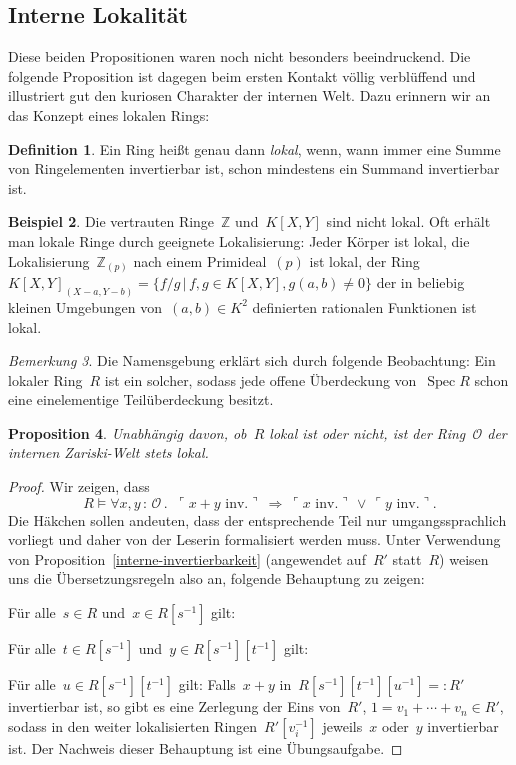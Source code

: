 \documentclass[a4paper,ngerman,12pt]{scrartcl}
\theoremstyle{definition}
\newtheorem{defn}{Definition}[section]
\newtheorem{bsp}[defn]{Beispiel}
\theoremstyle{plain}
\newtheorem{prop}[defn]{Proposition}
\theoremstyle{remark}
\newtheorem{bem}[defn]{Bemerkung}
\newcommand{\ZZ}{\mathbb{Z}}
\renewcommand{\O}{\mathcal{O}}
\DeclareMathOperator{\Spec}{Spec}
\renewcommand{\_}{\mathpunct{.}\,}
\newcommand{\?}{\,{:}\,}
\newcommand{\speak}[1]{\ulcorner\text{#1}\urcorner}
\newenvironment{indentblock}{%
  \list{}{\leftmargin\leftmargin}%
  \item\relax
}{%
  \endlist
}
\begin{document}
\subsection{Interne Lokalität}

Diese beiden Propositionen waren noch nicht besonders beeindruckend.
Die folgende Proposition ist dagegen beim ersten Kontakt völlig verblüffend und
illustriert gut den kuriosen Charakter der internen Welt. Dazu erinnern wir an
das Konzept eines lokalen Rings:
\begin{defn}Ein Ring heißt genau dann \emph{lokal}, wenn, wann immer eine Summe
von Ringelementen invertierbar ist, schon mindestens ein Summand invertierbar
ist.\end{defn}
\begin{bsp}Die vertrauten Ringe~$\ZZ$ und~$K[X,Y]$ sind nicht lokal. Oft erhält
man lokale Ringe durch geeignete Lokalisierung: Jeder Körper ist lokal,
die Lokalisierung~$\ZZ_{(p)}$ nach einem Primideal~$(p)$ ist lokal, der Ring
$K[X,Y]_{(X-a,Y-b)} = \{ f/g \,|\, f,g \in K[X,Y], g(a,b) \neq 0 \}$ der in
beliebig kleinen Umgebungen von~$(a,b) \in K^2$ definierten rationalen
Funktionen ist lokal.
\end{bsp}

\begin{bem}Die Namensgebung erklärt sich durch folgende Beobachtung: Ein
lokaler Ring~$R$ ist ein solcher, sodass jede offene Überdeckung von~$\Spec R$
schon eine einelementige Teilüberdeckung besitzt.\end{bem}

\begin{prop}\label{intern-lokal}%
Unabhängig davon, ob~$R$ lokal ist oder nicht, ist der Ring~$\O$
der internen Zariski-Welt stets lokal.\end{prop}
\begin{proof}
Wir zeigen, dass
\[ R \models \forall x,y\?\O\_\ \speak{$x+y$ inv.}\ \Longrightarrow\ 
  \speak{$x$ inv.} \,\vee\, \speak{$y$ inv.}. \]
Die Häkchen sollen andeuten, dass der entsprechende Teil nur umgangssprachlich
vorliegt und daher von der Leserin formalisiert werden muss. Unter Verwendung von
Proposition~\ref{interne-invertierbarkeit} (angewendet auf~$R'$
statt~$R$) weisen uns die
Übersetzungsregeln also an, folgende Behauptung zu zeigen:
\begin{indentblock}
Für alle~$s \in R$ und~$x \in R[s^{-1}]$ gilt:
\begin{indentblock}
Für alle~$t \in R[s^{-1}]$ und~$y \in R[s^{-1}][t^{-1}]$ gilt:
\begin{indentblock}
Für alle~$u \in R[s^{-1}][t^{-1}]$ gilt: Falls~$x+y$ in~$R[s^{-1}][t^{-1}][u^{-1}] =: R'$
invertierbar ist, so gibt es eine Zerlegung der Eins von~$R'$, $1 = v_1 +
\cdots + v_n \in R'$, sodass in den
weiter lokalisierten Ringen~$R'[v_i^{-1}]$ jeweils~$x$ oder~$y$ invertierbar
ist.
\end{indentblock}
\end{indentblock}
\end{indentblock}
Der Nachweis dieser Behauptung ist eine Übungsaufgabe.
\end{proof}
\end{document}
